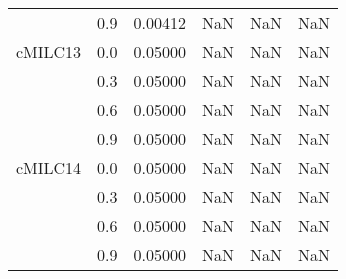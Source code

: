 \begin{longtable}{cccccc}
        & 0.9 & 0.00412 & NaN & NaN & NaN \\
cMILC13 & 0.0 & 0.05000 & NaN & NaN & NaN \\
        & 0.3 & 0.05000 & NaN & NaN & NaN \\
        & 0.6 & 0.05000 & NaN & NaN & NaN \\
        & 0.9 & 0.05000 & NaN & NaN & NaN \\
cMILC14 & 0.0 & 0.05000 & NaN & NaN & NaN \\
        & 0.3 & 0.05000 & NaN & NaN & NaN \\
        & 0.6 & 0.05000 & NaN & NaN & NaN \\
        & 0.9 & 0.05000 & NaN & NaN & NaN \\
\end{longtable}
